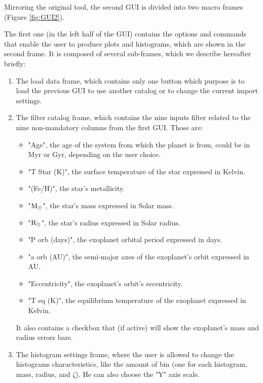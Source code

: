 \documentclass[fleqn,10pt]{SelfArx} %
\begin{document}
        	Mirroring the original tool, the second GUI is divided into two macro frames (Figure \ref{fig:GUI2}).

            The first one (in the left half of the GUI) contains the options and commands that enable the user to produce plots and histograms, which are shown in the second frame.
            It is composed of several sub-frames, which we describe hereafter briefly:
            \begin{enumerate}
                \item The load data frame, which contains only one button which purpose is to load the previous GUI to use another catalog or to change the current import settings.
                \item The filter catalog frame, which contains the nine inputs filter related to the nine non-mandatory columns from the first GUI. Those are:
                \begin{itemize}
                    \item "Age", the age of the system from which the planet is from, could be in Myr or Gyr, depending on the user choice.
                    \item "T Star (K)", the surface temperature of the star expressed in Kelvin.
                    \item "(Fe/H)", the star's metallicity.
                    \item "\(\textup{M}_\odot\)", the star's mass expressed in Solar mass.
                    \item "\(\textup{R}_\odot\)", the star's radius expressed in Solar radius.
                    \item "P orb (days)", the exoplanet orbital period expressed in days.
                    \item "a orb (AU)", the semi-major axes of the exoplanet's orbit expressed in AU.
                    \item "Eccentricity", the exoplanet's orbit's eccentricity.
                    \item "T eq (K)", the equilibrium temperature of the exoplanet expressed in Kelvin.
                \end{itemize}
                It also contains a checkbox that (if active) will show the exoplanet's mass and radius errors bars.
                \item The histogram settings frame, where the user is allowed to change the histograms characteristics, like the amount of bin (one for each histogram, mass, radius, and $\zeta$). He can also choose the "Y" axis scale.

\end{enumerate}
\end{document}

